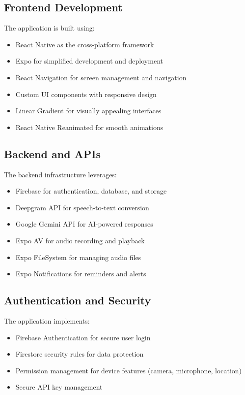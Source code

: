 \documentclass[11pt,a4paper]{article}
\begin{document}
\subsection{Frontend Development}
The application is built using:
\begin{itemize}
    \item React Native as the cross-platform framework
    \item Expo for simplified development and deployment
    \item React Navigation for screen management and navigation
    \item Custom UI components with responsive design
    \item Linear Gradient for visually appealing interfaces
    \item React Native Reanimated for smooth animations
\end{itemize}

\subsection{Backend and APIs}
The backend infrastructure leverages:
\begin{itemize}
    \item Firebase for authentication, database, and storage
    \item Deepgram API for speech-to-text conversion
    \item Google Gemini API for AI-powered responses
    \item Expo AV for audio recording and playback
    \item Expo FileSystem for managing audio files
    \item Expo Notifications for reminders and alerts
\end{itemize}

\subsection{Authentication and Security}
The application implements:
\begin{itemize}
    \item Firebase Authentication for secure user login
    \item Firestore security rules for data protection
    \item Permission management for device features (camera, microphone, location)
    \item Secure API key management
\end{itemize}
\end{document}
